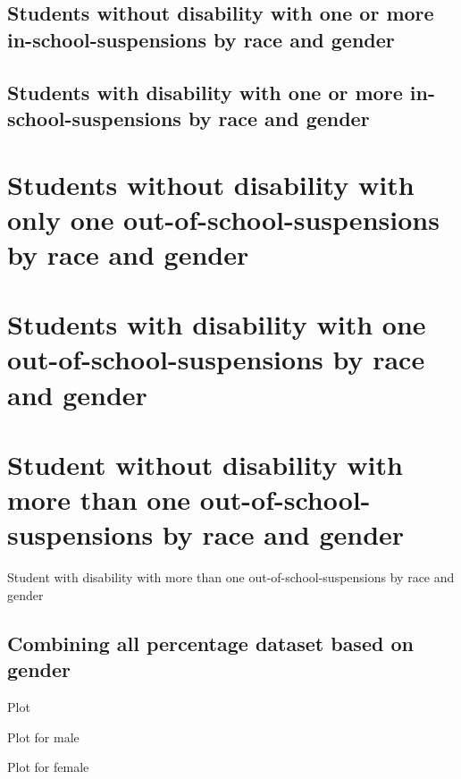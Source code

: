 \documentclass[
]{article}
\begin{document}
\hypertarget{students-without-disability-with-one-or-more-in-school-suspensions-by-race-and-gender}{%
\subsection{Students without disability with one or more
in-school-suspensions by race and
gender}\label{students-without-disability-with-one-or-more-in-school-suspensions-by-race-and-gender}}

\hypertarget{students-with-disability-with-one-or-more-in-school-suspensions-by-race-and-gender}{%
\subsection{Students with disability with one or more
in-school-suspensions by race and
gender}\label{students-with-disability-with-one-or-more-in-school-suspensions-by-race-and-gender}}

\hypertarget{students-without-disability-with-only-one-out-of-school-suspensions-by-race-and-gender}{%
\section{Students without disability with only one
out-of-school-suspensions by race and
gender}\label{students-without-disability-with-only-one-out-of-school-suspensions-by-race-and-gender}}

\hypertarget{students-with-disability-with-one-out-of-school-suspensions-by-race-and-gender}{%
\section{Students with disability with one out-of-school-suspensions by
race and
gender}\label{students-with-disability-with-one-out-of-school-suspensions-by-race-and-gender}}

\hypertarget{student-without-disability-with-more-than-one-out-of-school-suspensions-by-race-and-gender}{%
\section{Student without disability with more than one
out-of-school-suspensions by race and
gender}\label{student-without-disability-with-more-than-one-out-of-school-suspensions-by-race-and-gender}}

Student with disability with more than one out-of-school-suspensions by
race and gender

\hypertarget{combining-all-percentage-dataset-based-on-gender}{%
\subsection{Combining all percentage dataset based on
gender}\label{combining-all-percentage-dataset-based-on-gender}}

Plot

Plot for male

Plot for female
\end{document}
